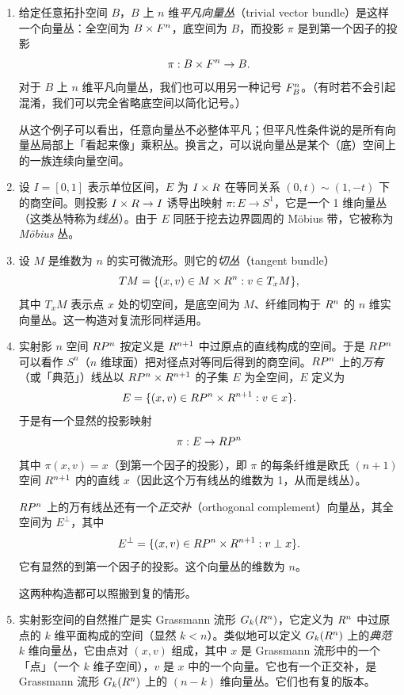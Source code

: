 \begin{enumerate}[label=\arabic*.]
\item 给定任意拓扑空间 $B$，$B$ 上 $n$ 维\emph{平凡向量丛}（trivial vector bundle）是这样一个向量丛：全空间为 $B\times F^n$，底空间为 $B$，而投影 $\pi$ 是到第一个因子的投影
\[ \pi: B\times F^n\to B. \]
对于 $B$ 上 $n$ 维平凡向量丛，我们也可以用另一种记号 $F^n_B$。（有时若不会引起混淆，我们可以完全省略底空间以简化记号。）

从这个例子可以看出，任意向量丛不必整体平凡；但平凡性条件说的是所有向量丛局部上「看起来像」乘积丛。换言之，可以说向量丛是某个（底）空间上的一族连续向量空间。

\item 设 $I=[0,1]$ 表示单位区间，$E$ 为 $I\times R$ 在等同关系 $(0,t)\sim(1,-t)$ 下的商空间。则投影 $I\times R\to I$ 诱导出映射 $\pi: E\to S^1$，它是一个 1 维向量丛（这类丛特称为\emph{线丛}）。由于 $E$ 同胚于挖去边界圆周的 Möbius 带，它被称为 \emph{Möbius} 丛。


\item 设 $M$ 是维数为 $n$ 的实可微流形。则它的\emph{切丛}（tangent bundle）
\[ TM=\{(x,v)\in M\times R^n : v\in T_xM\}, \]
其中 $T_xM$ 表示点 $x$ 处的切空间，是底空间为 $M$、纤维同构于 $R^n$ 的 $n$ 维实向量丛。这一构造对复流形同样适用。

\item 实射影 $n$ 空间 $R P^n$ 按定义是 $R^{n+1}$ 中过原点的直线构成的空间。于是 $R P^n$ 可以看作 $S^n$（$n$ 维球面）把对径点对等同后得到的商空间。$R P^n$ 上的\emph{万有}（或「典范」）线丛以 $R P^n\times R^{n+1}$ 的子集 $E$ 为全空间，$E$ 定义为
\[ E=\{(x,v)\in R P^n\times R^{n+1} : v\in x\}. \]
于是有一个显然的投影映射
\[ \pi: E\to R P^n \]
其中 $\pi(x,v)=x$（到第一个因子的投影），即 $\pi$ 的每条纤维是欧氏 $(n+1)$ 空间 $R^{n+1}$ 内的直线 $x$（因此这个万有线丛的维数为 1，从而是线丛）。

$R P^n$ 上的万有线丛还有一个\emph{正交补}（orthogonal complement）向量丛，其全空间为 $E^\perp$，其中
\[ E^\perp=\{(x,v)\in R P^n\times R^{n+1} : v\perp x\}. \]
它有显然的到第一个因子的投影。这个向量丛的维数为 $n$。


这两种构造都可以照搬到复的情形。

\item 实射影空间的自然推广是实 Grassmann 流形 $G_k(R^n)$，它定义为 $R^n$ 中过原点的 $k$ 维平面构成的空间（显然 $k<n$）。类似地可以定义 $G_k(R^n)$ 上的\emph{典范} $k$ 维向量丛，它由点对 $(x,v)$ 组成，其中 $x$ 是 Grassmann 流形中的一个「点」（一个 $k$ 维子空间），$v$ 是 $x$ 中的一个向量。它也有一个正交补，是 Grassmann 流形 $G_k(R^n)$ 上的 $(n-k)$ 维向量丛。它们也有复的版本。
\end{enumerate}

